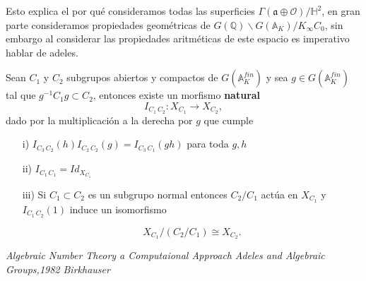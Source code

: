 \documentclass[letterpaper]{report}
\newcommand{\rac}{\ensuremath{ \mathbb Q }}
\newcommand{\Oan}{\ensuremath{\mathcal{O}}}
\newcommand{\Ad}{\ensuremath{\mathbb{A}}}
\newcommand{\hip}{\ensuremath{\mathbb H}}
\newcommand{\ga}{\ensuremath{\Gamma}}
\begin{document}
Esto explica el por qué consideramos todas las superficies $\ga(\mathfrak{a}\oplus\Oan)/\hip^2$, en gran parte consideramos propiedades geométricas de $G(\rac)\backslash G(\Ad_K)/K_{\infty}C_0$, sin embargo al considerar las propiedades aritméticas de este espacio es imperativo hablar de adeles.

Sean $C_1$ y $C_2$ subgrupos abiertos y compactos de $G(\Ad_K^{fin})$ y sea $g\in G(\Ad_K^{fin})$ tal que $g^{-1}C_1g\subset C_2$, entonces existe un morfismo \textbf{natural}
\begin{equation}
	I_{C_1\,C_2}:X_{C_1}\rightarrow X_{C_2},
\end{equation} 
dado por la multiplicación a la derecha por $g$ que cumple
\begin{itemize}
	\item[i)] $I_{C_3\,C_2}(h)I_{C_2\,C_2}(g)=I_{C_3\,C_1}(gh)$ para toda $g,h$
	\item[ii)] $I_{C_1\,C_1}=Id_{X_{C_1}}$
	\item[iii)] Si $C_1\subset C_2$ es un subgrupo normal entonces $C_2/C_1$ actúa en $X_{C_1}$ y $I_{C_1\,C_2}(1)$ induce un isomorfismo

		$$X_{C_{1}}/(C_2/C_1)\cong X_{C_{2}}.$$
\end{itemize}

\begin{thebibliography}{99}
 {\it Algebraic Number Theory a Computaional Approach}
 {\it Adeles and Algebraic Groups,1982 Birkhauser}
\end{thebibliography}
\end{document}
